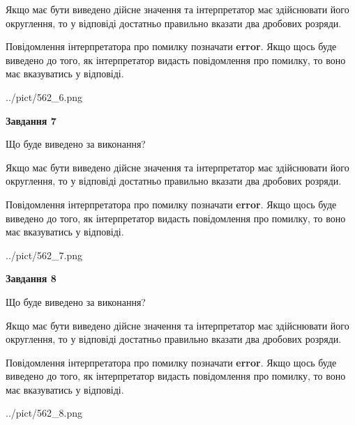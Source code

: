 \documentclass[12pt, ukrainian]{article}
\begin{document}
{\begin {Large}
Якщо має бути виведено дійсне значення та інтерпретатор має здійснювати його округлення, 
то у відповіді достатньо правильно вказати два дробових розряди.

Повідомлення інтерпретатора про помилку позначати \textbf{error}.
Якщо щось буде виведено до того, як інтерпретатор видасть повідомлення про помилку, 
то воно має вказуватись у відповіді. \par

\begin{center}
	{../pict/562_6.png}
\end{center}
\newpage

{\begin {center}\textbf{Завдання 7}\end {center}}\par
Що буде виведено за виконання? \par

Якщо має бути виведено дійсне значення та інтерпретатор має здійснювати його округлення, 
то у відповіді достатньо правильно вказати два дробових розряди.

Повідомлення інтерпретатора про помилку позначати \textbf{error}.
Якщо щось буде виведено до того, як інтерпретатор видасть повідомлення про помилку, 
то воно має вказуватись у відповіді. \par

\begin{center}
	{../pict/562_7.png}
\end{center}
\newpage

{\begin {center}\textbf{Завдання 8}\end {center}}\par
Що буде виведено за виконання? \par

Якщо має бути виведено дійсне значення та інтерпретатор має здійснювати його округлення, 
то у відповіді достатньо правильно вказати два дробових розряди.

Повідомлення інтерпретатора про помилку позначати \textbf{error}.
Якщо щось буде виведено до того, як інтерпретатор видасть повідомлення про помилку, 
то воно має вказуватись у відповіді. \par

\begin{center}
	{../pict/562_8.png}
\end{center}
\newpage


\end{Large}}
\end{document}
